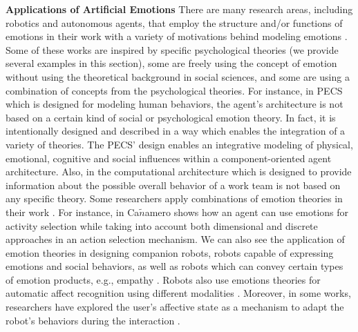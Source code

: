 \textbf{Applications of Artificial Emotions} There are many research areas,
including robotics and autonomous agents, that employ the structure and/or
functions of emotions in their work with a variety of motivations behind
modeling emotions \cite{wehrle:motivations-modeling-emotion}. Some of these
works are inspired by specific psychological theories (we provide several
examples in this section), some are freely using the concept of emotion without
using the theoretical background in social sciences, and some are using a
combination of concepts from the psychological theories. For instance, in PECS
\cite{urban:pecs} which is designed for modeling human behaviors, the agent's
architecture is not based on a certain kind of social or psychological emotion
theory. In fact, it is intentionally designed and described in a way which
enables the integration of a variety of theories. The PECS' design enables an
integrative modeling of physical, emotional, cognitive and social influences
within a component-oriented agent architecture. Also, in
\cite{miranda:teamwork-multiagent-system} the computational architecture which
is designed to provide information about the possible overall behavior of a work
team is not based on any specific theory. Some researchers apply combinations of
emotion theories in their work \cite{kiryazov:modeling-appraisal-pad}. For
instance, in \cite{canamero:designing-activity-selection} Ca$\tilde{n}$amero
shows how an agent can use emotions for activity selection while taking into
account both dimensional and discrete approaches in an action selection
mechanism. We can also see the application of emotion theories in designing
companion robots, robots capable of expressing emotions and social behaviors, as
well as robots which can convey certain types of emotion products, e.g., empathy
\cite{breazeal:expressive-behavior} \cite{leite:empathy-hri}
\cite{paiva:emotion-modeling} \cite{shayganfar:methodology}. Robots also use
emotions theories for automatic affect recognition using different modalities
\cite{hegel:empathic-robot} \cite{zeng:affect-recognition}. Moreover, in some
works, researchers have explored the user's affective state as a mechanism to
adapt the robot's behaviors during the interaction
\cite{breazeal:sociable-robot} \cite{liu:affect-robot-behavior}.

